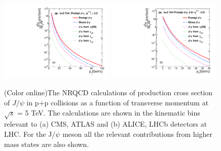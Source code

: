 \documentclass[12pt,a4paper,final]{iopart}
\begin{document}
\begin{figure}
\includegraphics[width=0.49\textwidth]{Fig9a_ATLAS_D2NDPtDy_RootS5TeV_PromptJPsi_Y2525.pdf}
\includegraphics[width=0.49\textwidth]{Fig9b_ALICE_D2NDPtDy_RootS5TeV_PromptJPsi_Y2045.pdf}
\caption{(Color online)The NRQCD calculations of production cross section of $J/\psi$ in p+p collisions 
  as a function of transverse momentum at $\sqrt{s}$ = 5 TeV. The calculations are shown in the kinematic
  bins relevant to (a) CMS, ATLAS and (b) ALICE, LHCb detectors at LHC. For the J/$\psi$ meson all the 
  relevant contributions from higher mass states are also shown.
}
\label{Fig:SigmaJPsi5TeV}
\end{figure}





\end{document}
